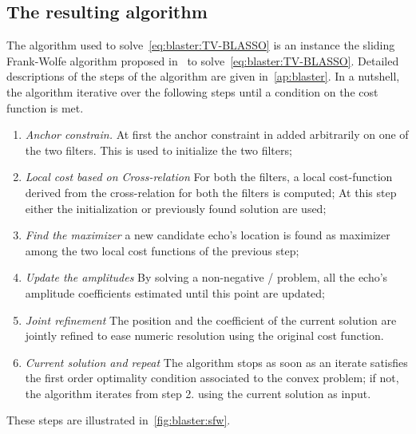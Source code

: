 \subsection{The resulting algorithm}
The algorithm used to solve~\cref{eq:blaster:TV-BLASSO} is an instance the sliding Frank-Wolfe algorithm proposed in~ to solve~\cref{eq:blaster:TV-BLASSO}.
Detailed descriptions of the steps of the algorithm are given in~\cref{ap:blaster}.
In a nutshell, the algorithm iterative over the following steps until a condition on the cost function is met.
\begin{enumerate}
    \item \textit{Anchor constrain.}
    At first the anchor constraint in added arbitrarily on one of the two filters. This is used to initialize the two filters;
    \item \textit{\textit{Local} cost based on Cross-relation}
    For both the filters, a local cost-function derived from the cross-relation for both the filters is computed;
    At this step either the initialization or previously found solution are used;
    \item \textit{Find the maximizer}
    a new candidate echo's location is found as maximizer among the two local cost functions of the previous step;
    \item \textit{Update the amplitudes}
    By solving a non-negative \LASSO/ problem, all the echo's amplitude coefficients estimated until this point are updated;
    \item \textit{Joint refinement}
    The position and the coefficient of the current solution are jointly refined to ease numeric resolution using the original cost function.
    \item \textit{Current solution and repeat}
    The algorithm stops as soon as an iterate satisfies the first order optimality condition associated to the convex problem;
    if not, the algorithm iterates from step 2. using the current solution as input.
\end{enumerate}
These steps are illustrated in~\cref{fig:blaster:sfw}.

